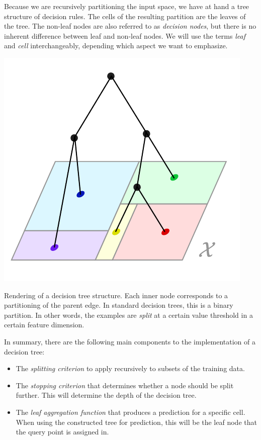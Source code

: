 \documentclass[../main.tex]{subfiles}
\begin{document}
Because we are recursively partitioning the input space, we have at hand a tree structure of decision rules. The cells of the resulting partition are the leaves of the tree. The non-leaf nodes are also referred to as \textit{decision nodes}, but there is no inherent difference between leaf and non-leaf nodes. We will use the terms \textit{leaf} and \textit{cell} interchangeably, depending which aspect we want to emphasize.



\begin{marginfigure}
    \label{fig:decision-tree-partition}
    \includegraphics[width=\textwidth]{figma-illustrations/decision-tree}
    \caption{
        Rendering of a decision tree structure. Each inner node corresponds to a partitioning of the parent edge. In standard decision trees, this is a binary partition. In other words, the examples are \textit{split} at a certain value threshold in a certain feature dimension.    }
\end{marginfigure}

    

In summary, there are the following main components to the implementation of a decision tree:
\begin{itemize}
    \item The \textit{splitting criterion} to apply recursively to subsets of the training data.
    \item The \textit{stopping criterion} that determines whether a node should be split further. This will determine the depth of the decision tree.
    \item The \textit{leaf aggregation function} that produces a prediction for a specific cell. When using the constructed tree for prediction, this will be the leaf node that the query point is assigned in.
\end{itemize}
\end{document}
